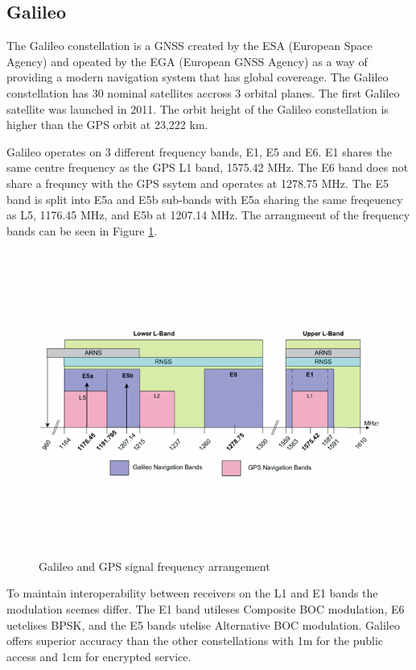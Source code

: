 \subsection{Galileo} \label{subsec:GNSS_GalileoIntro}
The Galileo constellation is a GNSS created by the ESA (European Space Agency) and opeated by the EGA (European GNSS Agency) as a way of providing a modern navigation
system that has global covereage. The Galileo constellation has 30 nominal satellites accross 3 orbital planes. The first Galileo satellite was launched in 2011.
The orbit height of the Galileo constellation is higher than the GPS orbit at 23,222 km. 

Galileo operates on 3 different frequency bands, E1, E5 and E6. E1 shares the same centre frequency as the GPS L1 band, 1575.42 MHz. The E6 band does not share a frequncy
with the GPS ssytem and operates at 1278.75 MHz. The E5 band is split into E5a and E5b sub-bands with E5a sharing the same freqeuency as L5, 1176.45 MHz, and E5b at
1207.14 MHz. The arrangmeent of the frequency bands can be seen in Figure \ref{fig:SignalPlan}.

\begin{figure}[h]
    \begin{centering}
        \includegraphics[width=14cm,height=10cm,keepaspectratio]{Figures/Galileo_Frequency_Plan.png}
        \caption{Galileo and GPS signal frequency arrangement}
        \label{fig:SignalPlan}
    \end{centering}
\end{figure}

To maintain interoperability between receivers on the L1 and E1 bands the modulation scemes differ.
The E1 band utileses Composite BOC modulation, E6 uetelises BPSK, and the E5 bands utelise Alternative BOC modulation.
Galileo offers superior accuracy than the other constellations with 1m for the public access and 1cm for encrypted service. 

